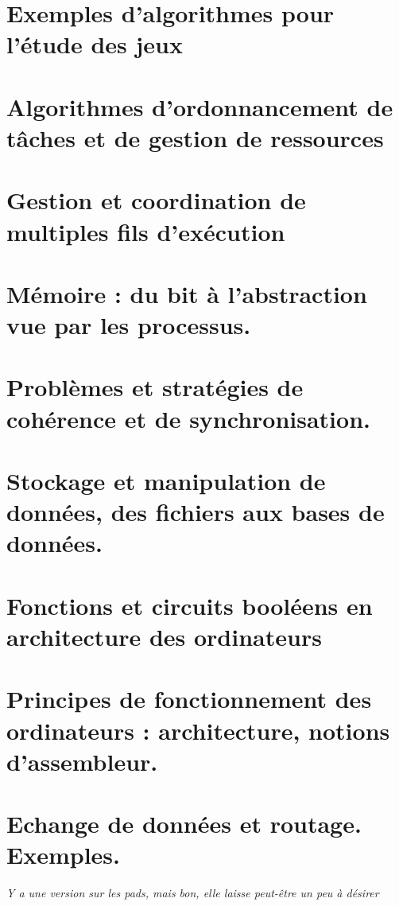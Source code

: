 \chapter{Exemples d'algorithmes pour l'étude des jeux} \label{L16}


\chapter{Algorithmes d'ordonnancement de tâches et de gestion de ressources} \label{L17}


\chapter{Gestion et coordination de multiples fils d'exécution} \label{L18}


\chapter{Mémoire : du bit à l’abstraction vue par les processus.} \label{L19}

\chapter{Problèmes et stratégies de cohérence et de synchronisation.} \label{L20}


\chapter{Stockage et manipulation de données, des fichiers aux bases de données.} \label{L21}


\chapter{Fonctions et circuits booléens en architecture des ordinateurs} \label{L22}


\chapter{Principes de fonctionnement des ordinateurs : architecture, notions d’assembleur.} \label{L23}


\chapter{Echange de données et routage. Exemples.} \label{L24}
\textit{Y a une version sur les pads, mais bon, elle laisse peut-être un peu à désirer}

